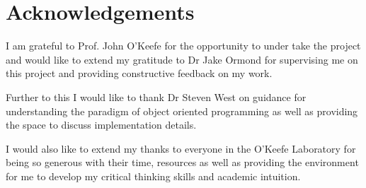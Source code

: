 \section*{Acknowledgements}

I am grateful to Prof. John O'Keefe for the opportunity to under take the project and would like to extend my gratitude to Dr Jake Ormond for supervising me on this project and providing constructive feedback on my work.

Further to this I would like to thank Dr Steven West on guidance for understanding the paradigm of object oriented programming as well as providing the space to discuss implementation details.

I would also like to extend my thanks to everyone 
in the O'Keefe Laboratory for being so generous with their time, resources as well as providing the environment for me to develop my critical thinking skills and academic intuition.
